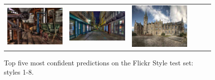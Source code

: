 \begin{figure}
\begin{minipage}[t]{\textwidth}
\begin{tabular}{m{.01\linewidth} m{.16\linewidth} m{.16\linewidth} m{.16\linewidth} m{.16\linewidth} m{.16\linewidth}}
    \includegraphics[width=\linewidth]{../style/figures/flickr_on_flickr/pred_style_HDR/2.jpg} &
    \includegraphics[width=\linewidth]{../style/figures/flickr_on_flickr/pred_style_HDR/3.jpg} &
    \includegraphics[width=\linewidth]{../style/figures/flickr_on_flickr/pred_style_HDR/4.jpg}
\end{tabular}
\end{minipage}
\caption{
    Top five most confident predictions on the Flickr Style test set: styles 1-8.
}\label{fig:flickr_on_flickr1}
\end{figure}

